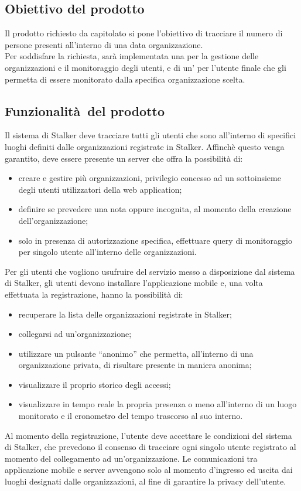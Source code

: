 \documentclass[../analisi-dei-requisiti.tex]{subfiles}
\begin{document}
\subsection{Obiettivo del prodotto}%
\label{sub:obiettivo_del_prodotto}
Il prodotto richiesto da capitolato si pone l'obiettivo di tracciare il numero di persone presenti all’interno di una data organizzazione.\\
Per soddisfare la richiesta, sarà implementata una  per la gestione delle organizzazioni e il monitoraggio degli utenti, e
di un' per l'utente finale che gli permetta di essere monitorato dalla specifica organizzazione scelta.


\subsection{Funzionalità del prodotto}%
\label{sub:funzionalita_del_prodotto}
Il sistema di Stalker deve tracciare tutti gli utenti che sono all'interno di specifici luoghi definiti dalle organizzazioni registrate in Stalker.
Affinchè questo venga garantito, deve essere presente un server che offra la possibilità di:
\begin{itemize}
  \item creare e gestire più organizzazioni, privilegio concesso ad un sottoinsieme degli utenti utilizzatori della web application;
  \item definire se prevedere una  nota oppure incognita, al momento della creazione dell'organizzazione;
  \item solo in presenza di autorizzazione specifica, effettuare query di monitoraggio per singolo utente all’interno delle organizzazioni.
\end{itemize}

Per gli utenti che vogliono usufruire del servizio messo a disposizione dal sistema di Stalker, gli utenti devono installare l'applicazione mobile
e, una volta effettuata la registrazione, hanno la possibilità di:
\begin{itemize}
  \item recuperare la lista delle organizzazioni registrate in Stalker;
  \item collegarsi ad un'organizzazione;
  \item utilizzare un pulsante “anonimo” che permetta, all’interno di una organizzazione privata, di risultare presente in maniera anonima;
  \item visualizzare il proprio storico degli accessi;
  \item visualizzare in tempo reale la propria presenza o meno all’interno di un luogo monitorato e il cronometro del tempo trascorso al suo interno.
\end{itemize}
Al momento della registrazione, l'utente deve accettare le condizioni del sistema di Stalker, che prevedono il consenso di tracciare
ogni singolo utente registrato al momento del collegamento ad un'organizzazione.
Le comunicazioni tra applicazione mobile e server avvengono solo al momento d'ingresso ed uscita dai luoghi designati dalle organizzazioni, al fine di garantire
la privacy dell'utente.
\end{document}
